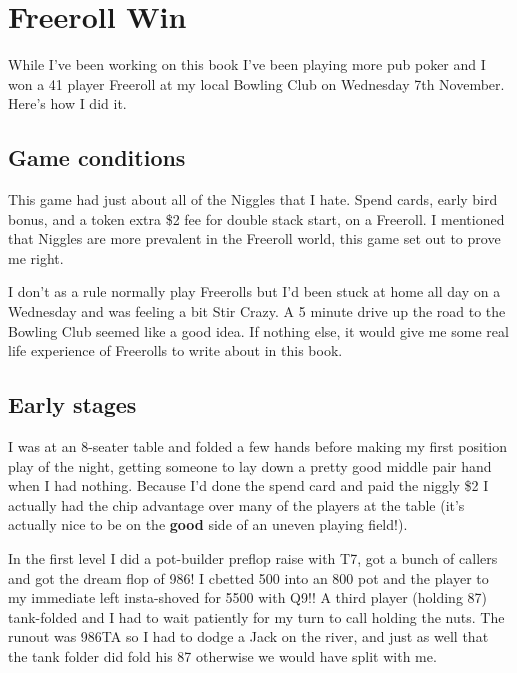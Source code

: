 \chapter{Freeroll Win}


While I've been working on this book I've been playing more
pub poker and I won a 41 player Freeroll at my local
Bowling Club on Wednesday 7th November. Here's how I
did it.

\section{Game conditions}

This game had just about all of the Niggles that I hate.
Spend cards, early bird bonus, and a token extra \$2 fee
for double stack start, on a Freeroll. I mentioned that
Niggles are more prevalent in the Freeroll world, this
game set out to prove me right.

I don't as a rule normally play Freerolls but I'd been stuck
at home all day on a Wednesday and was feeling a bit Stir Crazy.
A 5 minute drive up the road to the Bowling Club seemed like
a good idea. If nothing else, it would give me some real life
experience of Freerolls to write about in this book.


\section{Early stages}

I was at an 8-seater table and folded a few hands before
making my first position play of the night, getting someone
to lay down a pretty good middle pair hand when I had nothing.
Because I'd done the spend card and paid the niggly \$2 I actually
had the chip advantage over many of the players at the table
(it's actually nice to be on the \textbf{good} side of an
uneven playing field!).

In the first level I did a pot-builder preflop raise with T7,
got a bunch of callers and got the dream flop of 986! I cbetted
500 into an 800 pot and the player to my immediate left
insta-shoved for 5500 with Q9!! A third player (holding 87) tank-folded
and I had to wait patiently for my turn to call holding the nuts.
The runout was 986TA so I had to dodge a Jack on the river,
and just as well that the tank folder did fold his 87 otherwise we
would have split with me.


